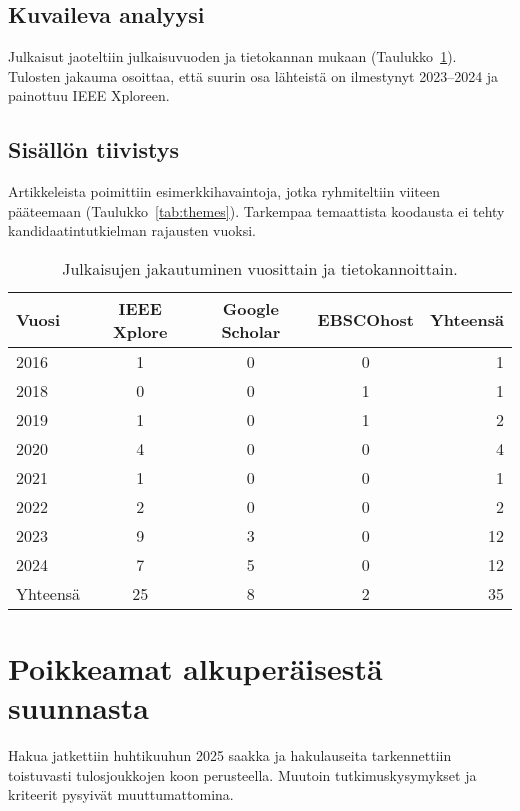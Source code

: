 \documentclass[bscthesis,finnish,oneside,biblatex]{uefcsthesis}
\begin{document}
\subsection{Kuvaileva analyysi}
Julkaisut jaoteltiin julkaisuvuoden ja tietokannan mukaan
(Taulukko~\ref{tab:descriptive}). Tulosten jakauma osoittaa, että
suurin osa lähteistä on ilmestynyt 2023–2024
ja painottuu IEEE Xploreen.

\subsection{Sisällön tiivistys}
Artikkeleista poimittiin esimerkkihavaintoja, jotka ryhmiteltiin
viiteen pääteemaan (Taulukko~\ref{tab:themes}).
Tarkempaa temaattista koodausta ei tehty kandidaatintutkielman
rajausten vuoksi.

\begin{table}[htbp]
  \centering
  \footnotesize
  \caption{Julkaisujen jakautuminen vuosittain ja tietokannoittain.}
  \label{tab:descriptive}
  \begin{tabular}{lcccr}
    \toprule
    \textbf{Vuosi} & \textbf{IEEE Xplore} & \textbf{Google Scholar} & \textbf{EBSCOhost} & \textbf{Yhteensä} \\
    \midrule
    2016 & 1 & 0 & 0 & 1  \\
    2018 & 0 & 0 & 1 & 1  \\
    2019 & 1 & 0 & 1 & 2  \\
    2020 & 4 & 0 & 0 & 4  \\
    2021 & 1 & 0 & 0 & 1  \\
    2022 & 2 & 0 & 0 & 2  \\
    2023 & 9 & 3 & 0 & 12 \\
    2024 & 7 & 5 & 0 & 12 \\
    \midrule
    Yhteensä & 25 & 8 & 2 & 35\\
    \bottomrule
  \end{tabular}
\end{table}

\section{Poikkeamat alkuperäisestä suunnasta}
\label{sec:deviations}

Hakua jatkettiin huhtikuuhun 2025 saakka ja
hakulauseita tarkennettiin toistuvasti tulosjoukkojen koon perusteella.
Muutoin tutkimuskysymykset ja kriteerit pysyivät muuttumattomina.
\end{document}
